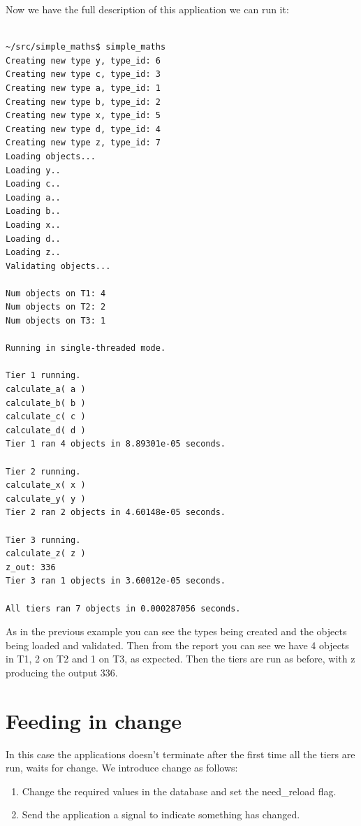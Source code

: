 \documentclass{report}
\begin{document}
Now we have the full description of this application we can run it:

\begin{verbatim}

~/src/simple_maths$ simple_maths
Creating new type y, type_id: 6
Creating new type c, type_id: 3
Creating new type a, type_id: 1
Creating new type b, type_id: 2
Creating new type x, type_id: 5
Creating new type d, type_id: 4
Creating new type z, type_id: 7
Loading objects...
Loading y..
Loading c..
Loading a..
Loading b..
Loading x..
Loading d..
Loading z..
Validating objects...

Num objects on T1: 4
Num objects on T2: 2
Num objects on T3: 1

Running in single-threaded mode.

Tier 1 running.
calculate_a( a )
calculate_b( b )
calculate_c( c )
calculate_d( d )
Tier 1 ran 4 objects in 8.89301e-05 seconds.

Tier 2 running.
calculate_x( x )
calculate_y( y )
Tier 2 ran 2 objects in 4.60148e-05 seconds.

Tier 3 running.
calculate_z( z )
z_out: 336
Tier 3 ran 1 objects in 3.60012e-05 seconds.

All tiers ran 7 objects in 0.000287056 seconds.

\end{verbatim}

As in the previous example you can see the types being created and the objects being loaded and validated. Then from the report you can see we have 4 objects in T1, 2 on T2 and 1 on T3, as expected. Then the tiers are run as before, with z producing the output 336.

\section{Feeding in change}

In this case the applications doesn't terminate after the first time all the tiers are run, waits for change. We introduce change as follows:

\begin{enumerate}

\item Change the required values in the database and set the need_reload flag.
\item Send the application a signal to indicate something has changed.

\end{enumerate}
\end{document}
